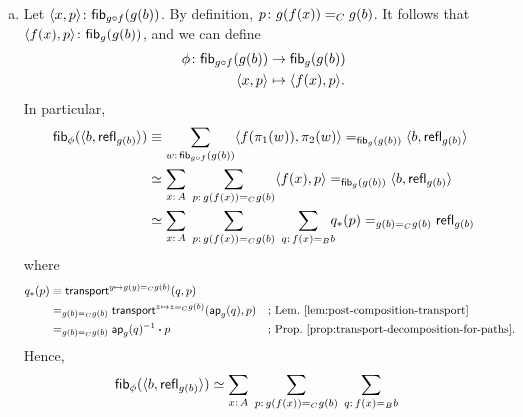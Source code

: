 \begin{solution}
    \begin{enumerate}[a),font=\upshape]
        \item Let $\dep{x,p}\colon\fun{fib}_{g\circ f}(g(b))$. By definition, $p\colon g(f(x))\eq{C}g(b)$. It follows that $\dep{f(x),p}\colon\fun{fib}_g(g(b))$, and we can define
        \begin{align*}
            \phi\colon\fun{fib}_{g\circ f}(g(b))
                &\to\fun{fib}_g(g(b))\\
            \dep{x,p}&\mapsto\dep{f(x),p}.
        \end{align*}
        In particular,
        \begin{align*}
            \fun{fib}_\phi(\dep{b,\fun{refl}_{g(b)}})
            &\equiv
                \sum_{w\colon\fun{fib}_{g\circ f}(g(b))}
                    \dep{f(\pi_1(w)),\pi_2(w)}
                    \eq{\fun{fib}_g(g(b))}
                    \dep{b,\fun{refl}_{g(b)}}\\
            &\simeq
                \sum_{x\colon A}\;
                \sum_{p\colon g(f(x))\eq{C}g(b)}
                    \dep{f(x),p}
                    \eq{\fun{fib}_g(g(b))}
                    \dep{b,\fun{refl}_{g(b)}}\\
            &\simeq
                \sum_{x\colon A}\;
                \sum_{p\colon g(f(x))\eq{C}g(b)}\;
                \sum_{q\colon f(x)\eq{B}b}
                    \!\!\!q_*(p)
                    \eq{g(b)\eq{C}g(b)}
                    \fun{refl}_{g(b)}                    
        \end{align*}
        where
        \begin{align*}
            q_*(p)&\equiv
                \mathsf{transport}^{y\mapsto g(y)\mathrel{=_{C}}g(b)}
                    (q,p)\\
            &\mathrel{=_{g(b)\mathrel{=_{C}}g(b)}}
                \mathsf{transport}^{z\mapsto z\mathrel{=_{C}}g(b)}
                    (\mathsf{ap}_g(q),p)
                &&\text{; Lem.~\ref{lem:post-composition-transport}}\\
            &\mathrel{=_{g(b)\mathrel{=_{C}}g(b)}}
                \mathsf{ap}_g(q)^{-1}\mathbin{\boldsymbol{\cdot}} p
                &&\text{; Prop.~\ref{prop:transport-decomposition-for-paths}.}
        \end{align*}
        Hence,
        \begin{align*}
            \fun{fib}_\phi(\dep{b,\fun{refl}_{g(b)}})
            &\simeq
                \sum_{x\colon A}\;
                \sum_{p\colon g(f(x))\eq{C}g(b)}\;
                \sum_{q\colon f(x)\eq{B}b}

\end{align*}
\end{enumerate}
\end{solution}
